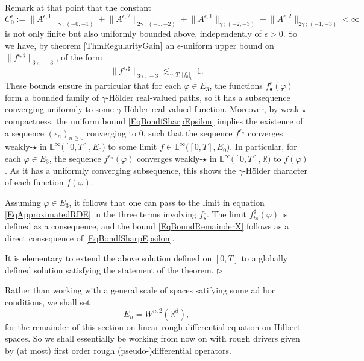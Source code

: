 \documentclass[11pt,a4paper]{amsart}
\newcommand{\RR}{\mathbb{R}}  \newcommand{\CC}{\mathbb{C}}  \newcommand{\LL}{\mathbb{L}}  \newcommand{\WW}{\mathbb{W}}
\renewcommand{\geq}{\geqslant}
\newcommand{\ssk}{\smallskip}
\numberwithin{equation}{section} %
\newenvironment{Dem}{%
    \begin{list}{\hspace{0.5cm}{\sc Proof --}}{%
        \setlength{\topsep}{0pt}%
        \setlength{\leftmargin}{0pt}%
        \setlength{\rightmargin}{0pt}%
        \setlength{\listparindent}{0pt}%
        \setlength{\itemindent}{0pt}%
        \setlength{\parsep}{0pt}%
        \addtolength{\leftmargin}{20pt}%
        \addtolength{\rightmargin}{0pt}%
    } \item }{\hfill{\space $\rhd$}\end{list}\smallskip}
\begin{document}
\begin{Dem}
\ssk

Remark at that point that the constant 
\begin{equation*}
C^\epsilon_0 := \big\|A^{\epsilon,1}\big\|_{\gamma\,;\,(-0,-1)}  + \big\|A^{\epsilon,2}\big\|_{2\gamma\,;\,(-0,-2)} +  \big\|A^{\epsilon,1}\big\|_{\gamma\,;\,(-2,-3)}  + \big\|A^{\epsilon,2}\big\|_{2\gamma\,;\,(-1,-3)}  < \infty
\end{equation*}
is not only finite but also uniformly bounded above, independently of $\epsilon>0$. So we have, by theorem \ref{ThmRegularityGain}  an $\epsilon$-uniform upper bound on $\big\|f^{\epsilon,\sharp}\big\|_{3\gamma\,;\,-3}$, of the form
\begin{equation}
\label{EqBondfSharpEpsilon}
\big\|f^{\epsilon,\sharp}\big\|_{3\gamma\,;\,-3} \lesssim_{\gamma,T,| f_0|_0}\,1. 
\end{equation}
These bounds ensure in particular that for each $\varphi\in E_3$, the functions $f^\epsilon_\bullet(\varphi)$ form a bounded family of $\gamma$-H\"older real-valued paths, so it has a subsequence converging uniformly to some $\gamma$-H\"older real-valued function. Moreover, by weak-$\star$ compactness, the uniform bound \eqref{EqBondfSharpEpsilon} implies the existence of a sequence $(\epsilon_n)_{n\geq 0}$ converging to $0$, such that the sequence $f^{\epsilon_n}$ converges weakly-$\star$ in $\LL^\infty\big([0,T],E_0\big)$ to some limit $f\in\LL^\infty\big([0,T],E_0\big)$. In particular, for each $\varphi\in E_3$, the sequence $f^{\epsilon_n}(\varphi)$ converges weakly-$\star$ in $\LL^\infty\big([0,T],\RR\big)$ to $f(\varphi)$. As it has a uniformly converging subsequence, this shows the $\gamma$-H\"older character of each function $f(\varphi)$. 

Assuming $\varphi\in E_3$, it follows that one can pass to the limit in equation \eqref{EqApproximatedRDE} in the three terms involving $f^\epsilon_s$. The limit $f^\sharp_{ts}(\varphi)$ is defined as a consequence, and the bound \eqref{EqBoundRemainderX} follows as a direct consequence of \eqref{EqBondfSharpEpsilon}.

\ssk 

It is elementary to extend the above solution defined on $[0,T]$ to a globally defined solution satisfying the statement of the theorem.
\end{Dem}

\bigskip

Rather than working with a general scale of spaces satifying some ad hoc conditions, we shall set 
$$
E_n = W^{n,2}(\RR^d),
$$
for the remainder of this section on linear rough differential equation on Hilbert spaces. So we shall essentially be working from now on with rough drivers given by (at most) first order rough (pseudo-)differential operators. 
\end{document}
